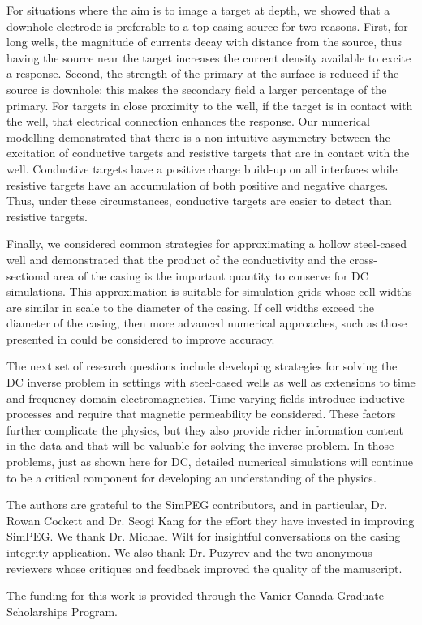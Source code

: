 \documentclass[extra,mreferee]{gji}
\begin{document}
For situations where the aim is to image a target at depth, we showed that a downhole electrode is preferable to a top-casing source for two reasons. First, for long wells, the magnitude of currents decay with distance from the source, thus having the source near the target increases the current density available to excite a response. Second, the strength of the primary at the surface is reduced if the source is downhole; this makes the secondary field a larger percentage of the primary.   For targets in close proximity to the well, if the target is in contact with the well, that electrical connection enhances the response. Our numerical modelling demonstrated that there is a non-intuitive asymmetry between the excitation of conductive targets and resistive targets that are in contact with the well. Conductive targets have a positive charge build-up on all interfaces while resistive targets have an accumulation of both positive and negative charges. Thus, under these circumstances, conductive targets are easier to detect than resistive targets.

Finally, we considered common strategies for approximating a hollow steel-cased well and demonstrated that the product of the conductivity and the cross-sectional area of the casing is the important quantity to conserve for DC simulations. This approximation is suitable for simulation grids whose cell-widths are similar in scale to the diameter of the casing. If cell widths exceed the diameter of the casing, then more advanced numerical approaches, such as those presented in \cite{Weiss2017, Caudillo-Mata2017a} could be considered to improve accuracy.

The next set of research questions include developing strategies for solving the DC inverse problem in settings with steel-cased wells as well as extensions to time and frequency domain electromagnetics. Time-varying fields introduce inductive processes and require that magnetic permeability be considered. These factors further complicate the physics, but they also provide richer information content in the data and that will be  valuable for solving the inverse problem. In those problems, just as shown here for DC, detailed numerical simulations will continue to be a critical component for developing an understanding of the physics.


\begin{acknowledgments}

The authors are grateful to the SimPEG contributors, and in particular, Dr. Rowan Cockett and Dr. Seogi Kang for the effort they have invested in improving SimPEG. We thank Dr. Michael Wilt for insightful conversations on the casing integrity application. We also thank Dr. Puzyrev and the two anonymous reviewers whose critiques and feedback improved the quality of the manuscript.

The funding for this work is provided through the Vanier Canada Graduate Scholarships Program.

\end{acknowledgments}
\end{document}

